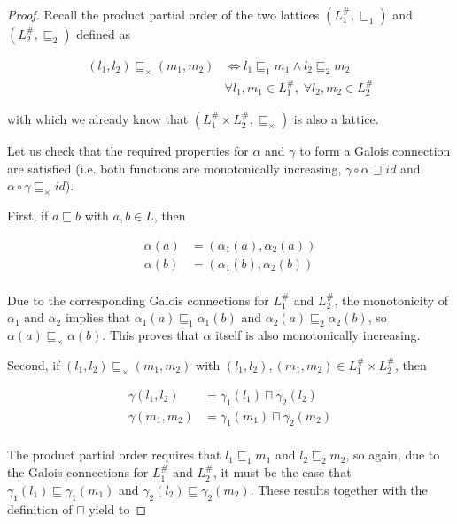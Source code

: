 \documentclass{article}
\begin{document}
\begin{proof}
  Recall the product partial order of the two lattices 
  $(L_1^\#, \sqsubseteq_1)$ and 
  $(L_2^\#, \sqsubseteq_2)$ defined
  as

  \begin{align*}
    (l_1, l_2) \sqsubseteq_\times (m_1, m_2) &
      \iff l_1 \sqsubseteq_1 m_1 
      \land l_2 \sqsubseteq_2 m_2 \\ 
        &\forall l_1, m_1 \in L_1^\#, \;\forall l_2, m_2 \in L_2^\#
  \end{align*}

  with which we already know that 
  $(L_1^\# \times L_2^\#, \sqsubseteq_\times)$ is also a 
  lattice.

  Let us check that the required properties for $\alpha$ and 
  $\gamma$ to form a Galois connection are satisfied (i.e. both 
  functions are monotonically increasing, $\gamma \circ \alpha
  \sqsupseteq id$ and $\alpha \circ \gamma \sqsubseteq_\times id$).

  First, if $a \sqsubseteq b$ with $a, b \in L$, then 

  \begin{align*}
    \alpha(a) &= (\alpha_1(a), \alpha_2(a)) \\
    \alpha(b) &= (\alpha_1(b), \alpha_2(b)) \\
  \end{align*}

  Due to the corresponding Galois connections for $L_1^\#$ and 
  $L_2^\#$, the monotonicity of $\alpha_1$ and $\alpha_2$ 
  implies that
  $\alpha_1(a) \sqsubseteq_1 \alpha_1(b)$ and 
  $\alpha_2(a) \sqsubseteq_2 \alpha_2(b)$, so 
  $\alpha(a) \sqsubseteq_\times \alpha(b)$. This proves that $\alpha$
  itself is also monotonically increasing.

  Second, if $(l_1, l_2) 
  \sqsubseteq_\times (m_1, m_2)$ with $
  (l_1, l_2), (m_1, m_2) \in L_1^\# \times L_2^\#$, then 

  \begin{align*}
    \gamma(l_1, l_2) &= \gamma_1(l_1) \sqcap \gamma_2(l_2) \\
    \gamma(m_1, m_2) &= \gamma_1(m_1) \sqcap \gamma_2(m_2) \\
  \end{align*}

  The product partial order requires that $l_1 \sqsubseteq_1 m_1$
  and $l_2 \sqsubseteq_2 m_2$, so again, due to the 
  Galois connections for $L_1^\#$ and $L_2^\#$, it must be the case 
  that $\gamma_1(l_1) \sqsubseteq \gamma_1(m_1)$ and 
  $\gamma_2(l_2) \sqsubseteq \gamma_2(m_2)$. These results
  together with the definition of $\sqcap$ yield to 


\end{proof}
\end{document}
